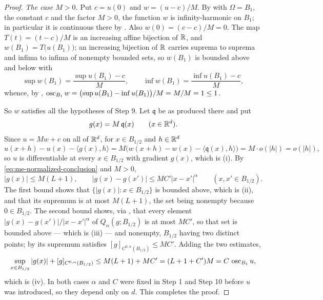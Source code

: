 \begin{proof}
\emph{The case $M>0$.} Put $c=u(0)$ and $w=(u-c)/M$. By
 with $\Omega=B_1$, the constant $c$ and the
factor $M>0$, the function $w$ is infinity-harmonic on $B_1$; in particular it
is continuous there by . Also $w(0)=(c-c)/M=0$. The map
$T(t)=(t-c)/M$ is an increasing affine bijection of $\mathbb{R}$, and
$w(B_1)=T\bigl(u(B_1)\bigr)$; an increasing bijection of $\mathbb{R}$ carries suprema to
suprema and infima to infima of nonempty bounded sets, so $w(B_1)$ is bounded
above and below with
\[
  \sup w(B_1)=\frac{\sup u(B_1)-c}{M},\qquad
  \inf w(B_1)=\frac{\inf u(B_1)-c}{M},
\]
whence, by ,
$\operatorname{osc}_{B_1}w=\bigl(\sup u(B_1)-\inf u(B_1)\bigr)/M=M/M=1\le1$.

So $w$ satisfies all the hypotheses of Step 9. Let $\mathfrak q$ be as produced
there and put
\[
  g(x)=M\,\mathfrak q(x)\qquad(x\in\mathbb{R}^d).
\]
Since $u=Mw+c$ on all of $\mathbb{R}^d$, for $x\in B_{1/2}$ and $h\in\mathbb{R}^d$
\[
  u(x+h)-u(x)-\langle g(x),h\rangle
   =M\bigl(w(x+h)-w(x)-\langle\mathfrak q(x),h\rangle\bigr)=M\cdot o(|h|)=o(|h|),
\]
so $u$ is differentiable at every $x\in B_{1/2}$ with gradient $g(x)$, which is
(i). By \eqref{eq:me-normalized-conclusion} and $M>0$,
\begin{equation}\label{eq:me-final-bounds}
  |g(x)|\le M(L+1),\qquad
  |g(x)-g(x')|\le MC'|x-x'|^\alpha\qquad(x,x'\in B_{1/2}).
\end{equation}
The first bound shows that $\{|g(x)|:x\in B_{1/2}\}$ is bounded above, which is
(ii), and that its supremum is at most $M(L+1)$, the set being nonempty because
$0\in B_{1/2}$. The second bound shows, via , that every
element $|g(x)-g(x')|/|x-x'|^\alpha$ of $Q_\alpha(g;B_{1/2})$ is at most $MC'$,
so that set is bounded above — which is (iii) — and nonempty, $B_{1/2}$ having
two distinct points; by  its supremum satisfies
$[g]_{C^{0,\alpha}(B_{1/2})}\le MC'$. Adding the two estimates,
\[
  \sup_{x\in B_{1/2}}|g(x)|+[g]_{C^{0,\alpha}(B_{1/2})}
   \le M(L+1)+MC'=(L+1+C')M=C\,\operatorname{osc}_{B_1}u ,
\]
which is (iv). In both cases $\alpha$ and $C$ were fixed in Step 1 and Step 10
before $u$ was introduced, so they depend only on $d$. This completes the
proof.
\end{proof}
